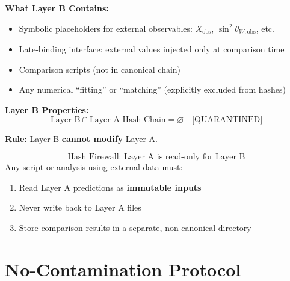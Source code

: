 \documentclass[11pt,a4paper]{article}
\theoremstyle{definition}
\begin{document}
\begin{layerbbox}
\textbf{What Layer B Contains:}
\begin{itemize}
\item Symbolic placeholders for external observables: $X_{\text{obs}}$, $\sin^2\theta_{W,\text{obs}}$, etc.
\item Late-binding interface: external values injected only at comparison time
\item Comparison scripts (not in canonical chain)
\item Any numerical ``fitting'' or ``matching'' (explicitly excluded from hashes)
\end{itemize}

\textbf{Layer B Properties:}
\begin{equation}
\label{eq:layer_b_quarantine}
\text{Layer B} \cap \text{Layer A Hash Chain} = \varnothing \quad \text{[QUARANTINED]}
\end{equation}

\textbf{Rule:} Layer B \textbf{cannot modify} Layer A.
\end{layerbbox}

\begin{firewallbox}
\begin{equation}
\label{eq:hash_firewall}
\boxed{\text{Hash Firewall: Layer A is read-only for Layer B}}
\end{equation}
Any script or analysis using external data must:
\begin{enumerate}
\item Read Layer A predictions as \textbf{immutable inputs}
\item Never write back to Layer A files
\item Store comparison results in a separate, non-canonical directory
\end{enumerate}
\end{firewallbox}

\tableofcontents
\newpage

\section{No-Contamination Protocol}
\label{sec:protocol}

\end{document}
